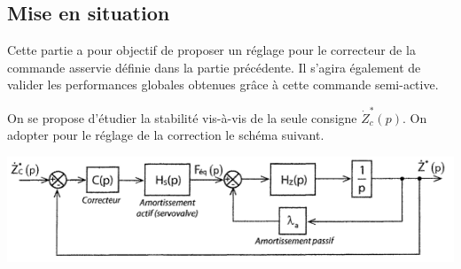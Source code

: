 \documentclass[10pt,fleqn]{article} %
\begin{document}

\vspace{4.5cm}
\pagestyle{fancy}
\thispagestyle{plain}


\def\columnseprulecolor{\color{ocre}}
\setlength{\columnseprule}{0.4pt} 

\ifprof
\else
\begin{multicols}{2}
\fi


\section*{Mise en situation}
\begin{obj}
Cette partie a pour objectif de proposer un réglage pour le correcteur de la commande asservie définie dans la partie précédente. Il s'agira également de valider les performances globales obtenues grâce à cette commande semi-active.
\end{obj}

On se propose d'étudier la stabilité vis-à-vis de la seule consigne  $\dot{Z}_c^*(p)$. On adopter pour le réglage de la correction le schéma suivant.

\begin{center}
\includegraphics[width=\linewidth]{images/fig_01}
\end{center}


\end{multicols}
\end{document}
